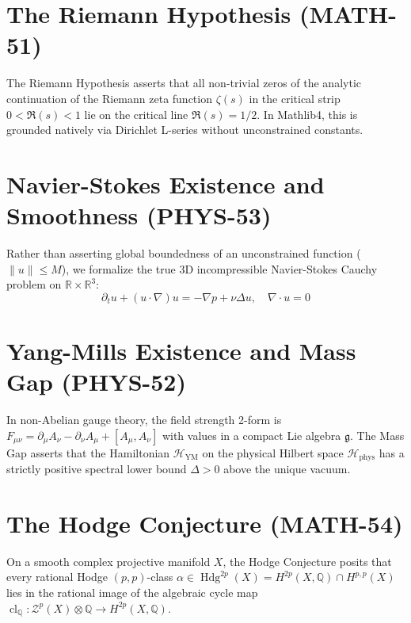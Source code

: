 \documentclass[11pt,a4paper]{article}
\begin{document}
\section{The Riemann Hypothesis (MATH-51)}
The Riemann Hypothesis asserts that all non-trivial zeros of the analytic continuation of the Riemann zeta function $\zeta(s)$ in the critical strip $0 < \Re(s) < 1$ lie on the critical line $\Re(s) = 1/2$. In Mathlib4, this is grounded natively via Dirichlet L-series without unconstrained constants.



\section{Navier-Stokes Existence and Smoothness (PHYS-53)}
Rather than asserting global boundedness of an unconstrained function ($\|u\| \le M$), we formalize the true 3D incompressible Navier-Stokes Cauchy problem on $\mathbb{R} \times \mathbb{R}^3$:
\begin{equation}
\partial_t u + (u \cdot \nabla)u = -\nabla p + \nu \Delta u, \quad \nabla \cdot u = 0
\end{equation}



\section{Yang-Mills Existence and Mass Gap (PHYS-52)}
In non-Abelian gauge theory, the field strength 2-form is $F_{\mu\nu} = \partial_\mu A_\nu - \partial_\nu A_\mu + [A_\mu, A_\nu]$ with values in a compact Lie algebra $\mathfrak{g}$. The Mass Gap asserts that the Hamiltonian $\mathcal{H}_{\text{YM}}$ on the physical Hilbert space $\mathcal{H}_{\text{phys}}$ has a strictly positive spectral lower bound $\Delta > 0$ above the unique vacuum.



\section{The Hodge Conjecture (MATH-54)}
On a smooth complex projective manifold $X$, the Hodge Conjecture posits that every rational Hodge $(p,p)$-class $\alpha \in \operatorname{Hdg}^{2p}(X) = H^{2p}(X, \mathbb{Q}) \cap H^{p,p}(X)$ lies in the rational image of the algebraic cycle map $\operatorname{cl}_{\mathbb{Q}} : \mathcal{Z}^p(X) \otimes \mathbb{Q} \to H^{2p}(X, \mathbb{Q})$.
\end{document}
